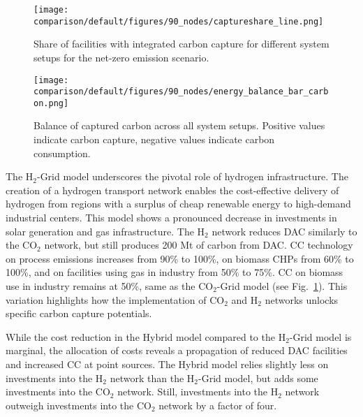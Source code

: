 \documentclass[twocolumn]{article}
\newcommand{\carbon}{CO$_2$}
\newcommand{\hydrogen}{H$_2$}
\newcommand{\modCO}{CO$_2$-Grid model}
\newcommand{\modH}{H$_2$-Grid model}
\begin{document}
\begin{figure}[h]
    \centering
    \texttt{[image: comparison/default/figures/90\_nodes/captureshare\_line.png]}
    \caption{Share of facilities with integrated carbon capture for different system setups for the net-zero emission scenario.}
    \label{fig:captureshare_line}
\end{figure}%

\begin{figure}[ht!]
    \centering
    \texttt{[image: comparison/default/figures/90\_nodes/energy\_balance\_bar\_carbon.png]}
    \caption{Balance of captured carbon across all system setups. Positive values indicate carbon capture, negative values indicate carbon consumption.}
    \label{fig:balance_captured_carbon}
\end{figure}


The \hydrogen{}-Grid model underscores the pivotal role of hydrogen infrastructure. The creation of a hydrogen transport network enables the cost-effective delivery of hydrogen from regions with a surplus of cheap renewable energy to high-demand industrial centers. This model shows a pronounced decrease in investments in solar generation and gas infrastructure. The \hydrogen{} network reduces DAC similarly to the \carbon{} network, but still produces 200 Mt of carbon from DAC. CC technology on process emissions increases from 90\% to 100\%, on biomass CHPs from 60\% to 100\%, and on facilities using gas in industry from 50\% to 75\%. CC on biomass use in industry remains at 50\%, same as the \modCO{} (see Fig.~\ref{fig:captureshare_line}). This variation highlights how the implementation of \carbon{} and \hydrogen{} networks unlocks specific carbon capture potentials.

While the cost reduction in the Hybrid model compared to the \hydrogen-Grid model is marginal, the allocation of costs reveals a propagation of reduced DAC facilities and increased CC at point sources. The Hybrid model relies slightly less on investments into the \hydrogen{} network than the \modH, but adds some investments into the \carbon{} network. Still, investments into the \hydrogen{} network outweigh investments into the \carbon{} network by a factor of four.
\end{document}
